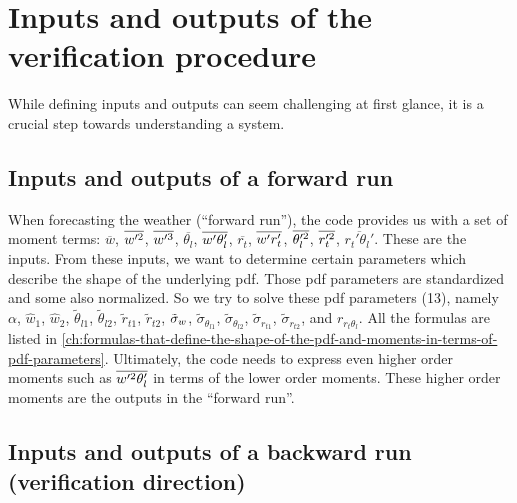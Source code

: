 \section{Inputs and outputs of the verification procedure}
\label{sec:inputs-and-outputs-of-the-verification-procedure}

While defining inputs and outputs can seem challenging at first glance,
it is a crucial step towards understanding a system.

\subsection{Inputs and outputs of a forward run}
\label{subsec:inputs-and-outputs-of-a-forward-run}

When forecasting the weather (\enquote{forward run}),
the code provides us with a set of moment terms:
$\overline{w}$, $\overline{w'^2}$, $\overline{w'^3}$, $\overline{\theta_l}$, $\overline{w' \theta_l'}$,
$\overline{r_t}$, $\overline{w' r_t'}$, $\overline{\theta_l'^2}$, $\overline{r_t'^2}$, $\overline{r_t'\theta_l'}$.
These are the inputs.
From these inputs,
we want to determine certain parameters which describe the shape of the underlying \gls{pdf}.
Those \gls{pdf} parameters are standardized and some also normalized.
So we try to solve these \gls{pdf} parameters (13),
namely $\alpha$, $\widehat{w}_1$, $\widehat{w}_2$, $\tilde{\theta}_{l1}$, $\tilde{\theta}_{l2}$, $\tilde{r}_{t1}$,
$\tilde{r}_{t2}$, ${\tilde{\sigma}_w}$, $\tilde{\sigma}_{\theta_{l1}}$, $\tilde{\sigma}_{\theta_{l2}}$,
$\tilde{\sigma}_{r_{t1}}$, $\tilde{\sigma}_{r_{t2}}$, and $r_{r_t \theta_l}$.
All the formulas are listed in \cref{ch:formulas-that-define-the-shape-of-the-pdf-and-moments-in-terms-of-pdf-parameters}.
Ultimately, the code needs to express even higher order moments such as $\overline{w'^2 \theta_l'}$
in terms of the lower order moments.
These higher order moments are the outputs in the \enquote{forward run}.

\subsection{Inputs and outputs of a backward run (verification direction)}
\label{subsec:inputs-and-outputs-of-a-backward-run-(verification-direction)}

